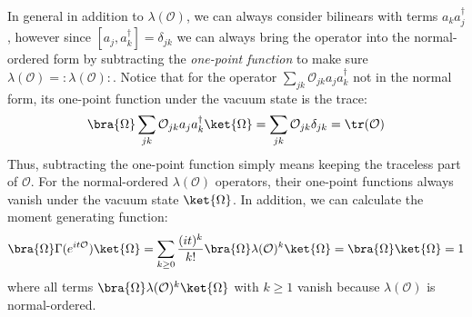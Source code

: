 \documentclass[a4paper,11pt]{article}
\theoremstyle{definition}
\numberwithin{equation}{section}
\begin{document}
In general in addition to $\lambda(\mathcal{O})$, we can always consider bilinears with terms $a_ka_j^\dagger$, however since $[a_j,a^\dagger_k]=\delta_{jk}$ we can always bring the operator into the normal-ordered form by subtracting the {\it one-point function} to make sure $\lambda(\mathcal{O})=:\lambda(\mathcal{O}):$. Notice that for the operator $\sum_{jk}\mathcal{O}_{jk}a_ja_k^\dagger$ not in the normal form, its one-point function under the vacuum state is the trace:
\begin{equation}
    \bra{\Omega}\sum_{jk}\mathcal{O}_{jk}a_ja_k^\dagger\ket{\Omega} = \sum_{jk}\mathcal{O}_{jk}\delta_{jk} = \tr(\mathcal{O})
\end{equation}
Thus, subtracting the one-point function simply means keeping the traceless part of $\mathcal{O}$. For the normal-ordered $\lambda(\mathcal{O})$ operators, their one-point functions always vanish under the vacuum state $\ket{\Omega}$. In addition, we can calculate the moment generating function:
\begin{equation}
    \bra{\Omega}\Gamma(e^{it\mathcal{O}})\ket{\Omega} = \sum_{k\geq 0}\frac{(it)^k}{k!}\bra{\Omega}\lambda(\mathcal{O})^k\ket{\Omega} = \bra{\Omega}\ket{\Omega} = 1
\end{equation}
where all terms $\bra{\Omega}\lambda(\mathcal{O})^k\ket{\Omega}$ with $k \geq 1$ vanish because $\lambda(\mathcal{O})$ is normal-ordered.
\end{document}
